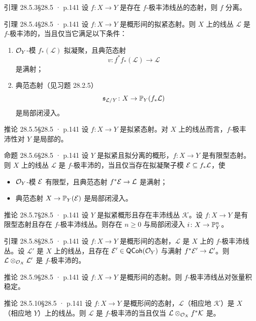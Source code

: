 \documentclass[UTF8,10pt,fontset=windows]{ctexart}
\newcommand{\cK}{\mathcal{K}}\newcommand{\cL}{\mathcal{L}}\newcommand{\cM}{\mathcal{M}}
\providecommand{\QCoh}{\mathsf{QCoh}}
\begin{document}
\begin{card}{引理 28.5.3}{§28.5 · p.141}
设 $f\colon X\to Y$ 是存在 $f$-极丰沛线丛的态射，则 $f$ 分离。
\end{card}
\begin{card}{引理 28.5.4}{§28.5 · p.141}
设 $f\colon X\to Y$ 是概形间的拟紧态射。则 $X$ 上的线丛 $\cL$ 是 $f$-极丰沛的，当且仅当它满足以下条件：
\begin{enumerate}[label=(\roman*),leftmargin=2.6em,itemsep=0.3ex]
  \item $\mathcal{O}_Y$-模 $f_*(\cL)$ 拟凝聚，且典范态射
  \[
  v\colon f^*f_*(\cL)\to\cL
  \]
  是满射；
  \item 典范态射（见习题 28.2.5）
  \[
  \mathfrak s_{\cL/Y}\colon X\to\PP_Y(f_*\cL)
  \]
  是局部闭浸入。
\end{enumerate}
\end{card}
\begin{card}{推论 28.5.5}{§28.5 · p.141}
设 $f\colon X\to Y$ 是拟紧态射。对 $X$ 上的线丛而言，$f$-极丰沛性对 $Y$ 是局部的。
\end{card}
\begin{card}{命题 28.5.6}{§28.5 · p.141}
设 $Y$ 是拟紧且拟分离的概形，$f\colon X\to Y$ 是有限型态射。则 $X$ 上的线丛 $\cL$ 是 $f$-极丰沛的，当且仅当存在拟凝聚子模 $\cE\subseteq f_*\cL$，使
\begin{itemize}[leftmargin=1.6em,itemsep=0.25ex]
  \item $\mathcal{O}_Y$-模 $\mathcal{E}$ 有限型，且典范态射 $f^*\cE\to\cL$ 是满射；
  \item 典范态射 $X\to\mathbb{P}_Y(\mathcal{E})$ 是局部闭浸入。
\end{itemize}
\end{card}
\begin{card}{推论 28.5.7}{§28.5 · p.141}
设 $Y$ 是拟紧概形且存在丰沛线丛 $\cK$。设 $f\colon X\to Y$ 是有限型态射且存在 $f$-极丰沛线丛。则存在 $n\ge 0$ 与局部闭浸入 $i\colon X\to\mathbb{P}^n_Y$。
\end{card}
\begin{card}{引理 28.5.8}{§28.5 · p.141}
设 $f\colon X\to Y$ 是概形间的态射，$\cL$ 是 $X$ 上的 $f$-极丰沛线丛。设 $\cL'$ 是 $X$ 上的线丛，且存在 $\cE'\in\QCoh(\cO_Y)$ 与满射 $f^*\cE'\to\cL'$。则 $\cL\otimes_{\cO_X}\cL'$ 是 $f$-极丰沛的。
\end{card}
\begin{card}{推论 28.5.9}{§28.5 · p.141}
设 $f\colon X\to Y$ 是概形间的态射。则 $f$-极丰沛线丛对张量积稳定。
\end{card}
\begin{card}{推论 28.5.10}{§28.5 · p.141}
设 $f\colon X\to Y$ 是概形间的态射，$\cL$（相应地 $\cK$）是 $X$（相应地 $Y$）上的线丛。则 $\cL$ 是 $f$-极丰沛的当且仅当 $\cL\otimes_{\cO_X}f^*\cK$ 是。
\end{card}
\end{document}
